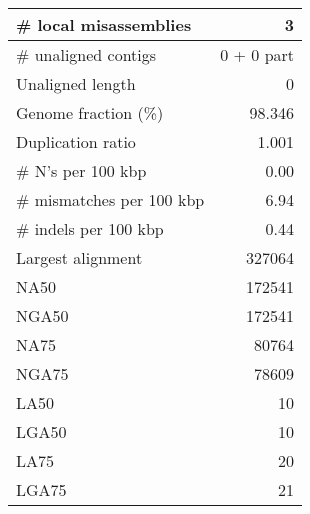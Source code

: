 \documentclass[12pt,a4paper]{article}
\begin{document}
\begin{table}[ht]
\begin{center}
\begin{tabular}{|l*{1}{|r}|}
\# local misassemblies & 3 \\ \hline
\# unaligned contigs & 0 + 0 part \\ \hline
Unaligned length & 0 \\ \hline
Genome fraction (\%) & 98.346 \\ \hline
Duplication ratio & 1.001 \\ \hline
\# N's per 100 kbp & 0.00 \\ \hline
\# mismatches per 100 kbp & 6.94 \\ \hline
\# indels per 100 kbp & 0.44 \\ \hline
Largest alignment & 327064 \\ \hline
NA50 & 172541 \\ \hline
NGA50 & 172541 \\ \hline
NA75 & 80764 \\ \hline
NGA75 & 78609 \\ \hline
LA50 & 10 \\ \hline
LGA50 & 10 \\ \hline
LA75 & 20 \\ \hline
LGA75 & 21 \\ \hline
\end{tabular}
\end{center}
\end{table}
\end{document}
